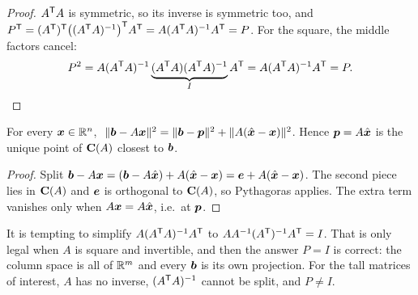 \begin{proof}
$A^{\mathsf{T}} A$ is symmetric, so its inverse is symmetric too, and
$P^{\mathsf{T}}=(A^{\mathsf{T}})^{\mathsf{T}}\bigl((A^{\mathsf{T}} A)^{-1}\bigr)^{\mathsf{T}} A^{\mathsf{T}}=A(A^{\mathsf{T}} A)^{-1}A^{\mathsf{T}}=P$. For the square, the middle
factors cancel:
\[
  P^2=A(A^{\mathsf{T}} A)^{-1}\underbrace{(A^{\mathsf{T}} A)(A^{\mathsf{T}} A)^{-1}}_{I}A^{\mathsf{T}}=A(A^{\mathsf{T}} A)^{-1}A^{\mathsf{T}}=P.\qedhere
\]
\end{proof}

\begin{theorem}\label{thm:u17-closest}
For every $\boldsymbol{x}\in\mathbb{R}^n$,
$\ \|\vb{b}-A\vb{x}\|^2=\|\vb{b}-\vb{p}\|^2+\|A(\hat{\vb{x}}-\vb{x})\|^2$. Hence
$\boldsymbol{p}=A\hat{\boldsymbol{x}}$ is the unique point of $\mathbf{C}(A)$ closest to $\boldsymbol{b}$.
\end{theorem}

\begin{proof}
Split $\boldsymbol{b}-A\boldsymbol{x}=(\boldsymbol{b}-A\hat{\boldsymbol{x}})+A(\hat{\boldsymbol{x}}-\boldsymbol{x})=\boldsymbol{e}+A(\hat{\boldsymbol{x}}-\boldsymbol{x})$.
The second piece lies in $\mathbf{C}(A)$ and $\boldsymbol{e}$ is orthogonal to $\mathbf{C}(A)$, so Pythagoras
applies. The extra term vanishes only when $A\boldsymbol{x}=A\hat{\boldsymbol{x}}$, i.e.\ at $\boldsymbol{p}$.
\end{proof}

\begin{trap}
It is tempting to simplify $A(A^{\mathsf{T}} A)^{-1}A^{\mathsf{T}}$ to $AA^{-1}(A^{\mathsf{T}})^{-1}A^{\mathsf{T}}=I$. That is only
legal when $A$ is square and invertible, and then the answer $P=I$ is correct: the column
space is all of $\mathbb{R}^m$ and every $\boldsymbol{b}$ is its own projection. For the tall matrices of
interest, $A$ has no inverse, $(A^{\mathsf{T}} A)^{-1}$ cannot be split, and $P\neq I$.
\end{trap}

